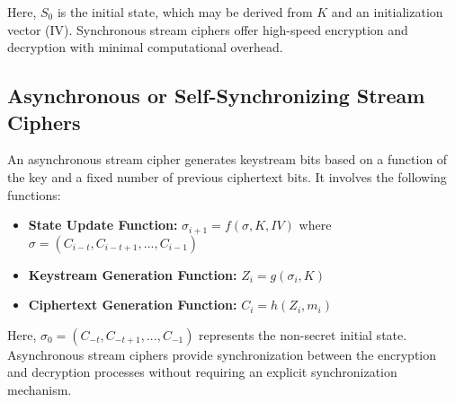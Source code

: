 \documentclass[11pt]{article}
\begin{document}
Here, \(S_0\) is the initial state, which may be derived from \(K\) and an initialization vector (IV). Synchronous stream ciphers offer high-speed encryption and decryption with minimal computational overhead.

\subsection{Asynchronous or Self-Synchronizing Stream Ciphers}

An asynchronous stream cipher generates keystream bits based on a function of the key and a fixed number of previous ciphertext bits. It involves the following functions:

\begin{itemize}
    \item \textbf{State Update Function:} \(\sigma_{i+1} = f(\sigma, K, IV)\) where \(\sigma = (C_{i-t}, C_{i-t+1}, ..., C_{i-1})\)
    \item \textbf{Keystream Generation Function:} \(Z_i = g(\sigma_i, K)\)
    \item \textbf{Ciphertext Generation Function:} \(C_i = h(Z_i, m_i)\)
\end{itemize}

Here, \(\sigma_0 = (C_{-t}, C_{-t+1}, ..., C_{-1})\) represents the non-secret initial state. Asynchronous stream ciphers provide synchronization between the encryption and decryption processes without requiring an explicit synchronization mechanism.
\end{document}

